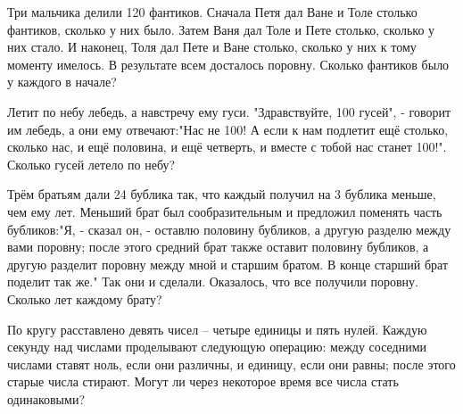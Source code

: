 \newpage

 Три мальчика делили 120 фантиков. Сначала Петя дал Ване и Толе столько фантиков, сколько у них было. Затем Ваня дал Толе и Пете столько, сколько у них стало. И наконец, Толя дал Пете и Ване столько, сколько у них к тому моменту имелось. В результате всем досталось поровну. Сколько фантиков было у каждого в начале? 

 Летит по небу лебедь, а навстречу ему гуси. "Здравствуйте, 100 гусей", - говорит им лебедь, а они ему отвечают:"Нас не 100! А если к нам подлетит ещё столько, сколько нас, и ещё половина, и ещё четверть, и вместе с тобой нас станет 100!". Сколько гусей летело по небу?

 Трём братьям дали 24 бублика так, что каждый получил на 3 бублика меньше, чем ему лет. Меньший брат был сообразительным и предложил поменять часть бубликов:"Я, - сказал он, - оставлю половину бубликов, а другую разделю между вами поровну; после этого средний брат также оставит половину бубликов, а другую разделит поровну между мной и старшим братом. В конце старший брат поделит так же." Так они и сделали. Оказалось, что все получили поровну. Сколько лет каждому брату?

 По кругу расставлено девять чисел – четыре единицы и пять нулей. Каждую секунду над числами проделывают следующую операцию: между соседними числами ставят ноль, если они различны, и единицу, если они равны; после этого старые числа стирают.
Могут ли через некоторое время все числа стать одинаковыми?
